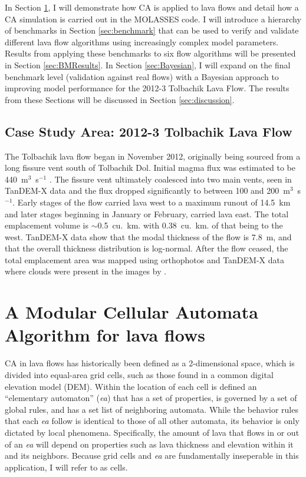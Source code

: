 \documentclass[12pt,letter]{article}
\begin{document}
	In Section \ref{sec:MOLASSES}, I will demonstrate how CA is applied to lava flows and detail how a CA simulation is carried out in the MOLASSES code. I will introduce a hierarchy of benchmarks in Section \ref{sec:benchmark} that can be used to verify and validate different lava flow algorithms using increasingly complex model parameters. Results from applying these benchmarks to six flow algorithms will be presented in Section \ref{sec:BMResults}. In Section \ref{sec:Bayesian}, I will expand on the final benchmark level (validation against real flows) with a Bayesian approach to improving model performance for the 2012-3 Tolbachik Lava Flow. The results from these Sections will be discussed in Section \ref{sec:discussion}.
	
	\subsection{Case Study Area: 2012-3 Tolbachik Lava Flow}\label{sec:tolb_back}
The Tolbachik lava flow began in November 2012, originally being sourced from a long fissure vent south of Tolbachik Dol. Initial magma flux was estimated to be 440~m$^3$~s$^{-1}$ \citep{belousov2015overview}. The fissure vent ultimately coalesced into two main vents, seen in TanDEM-X data and the flux dropped significantly to between 100 and 200~m$^3$~s$^{-1}$. Early stages of the flow carried lava west to a maximum runout of 14.5~km and later stages beginning in January or February, carried lava east. The total emplacement volume is $\sim$0.5~cu.~km. with 0.38~cu.~km. of that being to the west. TanDEM-X data show that the modal thickness of the flow is 7.8~m, and that the overall thickness distribution is log-normal. After the flow ceased, the total emplacement area was mapped using orthophotos and TanDEM-X data where clouds were present in the images by \citet{kubanek2015lava}.
	


\section{A Modular Cellular Automata Algorithm for lava flows}\label{sec:MOLASSES}

CA in lava flows has historically been defined as a 2-dimensional space, which is divided into equal-area grid cells, such as those found in a common digital elevation model (DEM). Within the location of each cell is defined an ``elementary automaton'' (\textit{ea}) that has a set of properties, is governed by a set of global rules, and has a set list of neighboring automata. While the behavior rules that each \textit{ea} follow is identical to those of all other automata, its behavior is only dictated by local phenomena. Specifically, the amount of lava that flows in or out of an \textit{ea} will depend on properties such as lava thickness and elevation within it and its neighbors. Because grid cells and \textit{ea} are fundamentally inseperable in this application, I will refer to  as cells.
\end{document}
